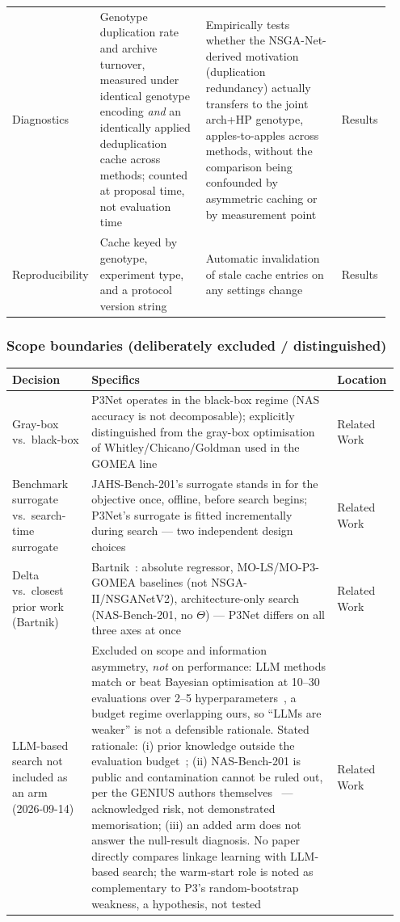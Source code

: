 \begin{longtable}{p{0.16\linewidth} p{0.28\linewidth} p{0.36\linewidth} p{0.13\linewidth}}
Diagnostics & Genotype duplication rate and archive turnover, measured under identical genotype encoding \emph{and} an identically applied deduplication cache across methods; counted at proposal time, not evaluation time & Empirically tests whether the NSGA-Net-derived motivation (duplication redundancy) actually transfers to the joint arch+HP genotype, apples-to-apples across methods, without the comparison being confounded by asymmetric caching or by measurement point & Results \\
Reproducibility & Cache keyed by genotype, experiment type, and a protocol version string & Automatic invalidation of stale cache entries on any settings change & Results \\
\bottomrule
\end{longtable}

\subsubsection*{Scope boundaries (deliberately excluded / distinguished)}
\begin{longtable}{p{0.20\linewidth} p{0.62\linewidth} p{0.13\linewidth}}
\toprule
\textbf{Decision} & \textbf{Specifics} & \textbf{Location} \\
\midrule
\endhead
Gray-box vs.\ black-box & P3Net operates in the black-box regime (NAS accuracy is not decomposable); explicitly distinguished from the gray-box optimisation of Whitley/Chicano/Goldman used in the GOMEA line & Related Work \\
Benchmark surrogate vs.\ search-time surrogate & JAHS-Bench-201's surrogate stands in for the objective once, offline, before search begins; P3Net's surrogate is fitted incrementally during search --- two independent design choices & Related Work \\
Delta vs.\ closest prior work (Bartnik) & Bartnik~\citep{bartnik2026evolutionary}: absolute regressor, MO-LS/MO-P3-GOMEA baselines (not NSGA-II/NSGANetV2), architecture-only search (NAS-Bench-201, no $\Theta$) --- P3Net differs on all three axes at once & Related Work \\
LLM-based search not included as an arm (2026-09-14) & Excluded on scope and information asymmetry, \emph{not} on performance: LLM methods match or beat Bayesian optimisation at 10--30 evaluations over 2--5 hyperparameters~\citep{zhang2024llmhpo,liu2024llambo}, a budget regime overlapping ours, so ``LLMs are weaker'' is not a defensible rationale. Stated rationale: (i) prior knowledge outside the evaluation budget~\citep{kristiadi2024sober,gupta2025llmbo}; (ii) NAS-Bench-201 is public and contamination cannot be ruled out, per the GENIUS authors themselves~\citep{zheng2023genius} --- acknowledged risk, not demonstrated memorisation; (iii) an added arm does not answer the null-result diagnosis. No paper directly compares linkage learning with LLM-based search; the warm-start role is noted as complementary to P3's random-bootstrap weakness, a hypothesis, not tested & Related Work \\
\bottomrule
\end{longtable}


